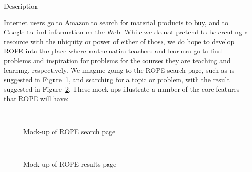 \documentclass[11pt]{article}
\begin{document}
\begin{section}{Description}

Internet users go to Amazon to search for material products to buy, and to
Google to find information on the Web.  While we do not pretend to be
creating a resource with the ubiquity or power of either of those, we do
hope to develop ROPE into the place where mathematics teachers and
learners go to find problems and inspiration for problems for the courses
they are teaching and learning, respectively.  We imagine going to the
ROPE search page, such as is suggested in Figure~\ref{rope1}, and
searching for a topic or problem, with the result suggested in
Figure~\ref{rope2}.  These mock-ups illustrate a number of the core
features that ROPE will have:

\begin{figure}
\begin{center}
\\
\caption{Mock-up of ROPE search page}
\label{rope1}
\end{center}
\end{figure}

\begin{figure}
\begin{center}
\\
\caption{Mock-up of ROPE results page}
\label{rope2}
\end{center}
\end{figure}


\end{section}
\end{document}
